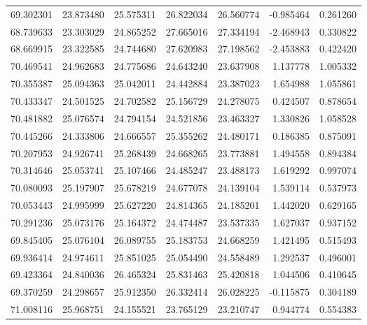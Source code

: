 \begin{tabular}{rrrrrrr}
 69.302301 &  23.873480 &         25.575311 &         26.822034 &         26.560774 & -0.985464 &  0.261260 \\
 68.739633 &  23.303029 &         24.865252 &         27.665016 &         27.334194 & -2.468943 &  0.330822 \\
 68.669915 &  23.322585 &         24.744680 &         27.620983 &         27.198562 & -2.453883 &  0.422420 \\
 70.469541 &  24.962683 &         24.775686 &         24.643240 &         23.637908 &  1.137778 &  1.005332 \\
 70.355387 &  25.094363 &         25.042011 &         24.442884 &         23.387023 &  1.654988 &  1.055861 \\
 70.433347 &  24.501525 &         24.702582 &         25.156729 &         24.278075 &  0.424507 &  0.878654 \\
 70.481882 &  25.076574 &         24.794154 &         24.521856 &         23.463327 &  1.330826 &  1.058528 \\
 70.445266 &  24.333806 &         24.666557 &         25.355262 &         24.480171 &  0.186385 &  0.875091 \\
 70.207953 &  24.926741 &         25.268439 &         24.668265 &         23.773881 &  1.494558 &  0.894384 \\
 70.314646 &  25.053741 &         25.107466 &         24.485247 &         23.488173 &  1.619292 &  0.997074 \\
 70.080093 &  25.197907 &         25.678219 &         24.677078 &         24.139104 &  1.539114 &  0.537973 \\
 70.053443 &  24.995999 &         25.627220 &         24.814365 &         24.185201 &  1.442020 &  0.629165 \\
 70.291236 &  25.073176 &         25.164372 &         24.474487 &         23.537335 &  1.627037 &  0.937152 \\
 69.845405 &  25.076104 &         26.089755 &         25.183753 &         24.668259 &  1.421495 &  0.515493 \\
 69.936414 &  24.974611 &         25.851025 &         25.054490 &         24.558489 &  1.292537 &  0.496001 \\
 69.423364 &  24.840036 &         26.465324 &         25.831463 &         25.420818 &  1.044506 &  0.410645 \\
 69.370259 &  24.298657 &         25.912350 &         26.332414 &         26.028225 & -0.115875 &  0.304189 \\
 71.008116 &  25.968751 &         24.155521 &         23.765129 &         23.210747 &  0.944774 &  0.554383 \\

\end{tabular}
